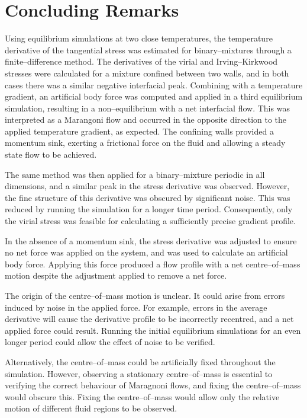 \section{Concluding Remarks}
Using equilibrium simulations at two close temperatures, the temperature derivative of the tangential stress was estimated for binary--mixtures through a finite--difference method.
The derivatives of the virial and Irving--Kirkwood stresses were calculated for a mixture confined between two walls, and in both cases there was a similar negative interfacial peak.
Combining with a temperature gradient, an artificial body force was computed and applied in a third equilibrium simulation, resulting in a non--equilibrium with a net interfacial flow.
This was interpreted as a Marangoni flow and occurred in the opposite direction to the applied temperature gradient, as expected.
The confining walls provided a momentum sink, exerting a frictional force on the fluid and allowing a steady state flow to be achieved.

The same method was then applied for a binary--mixture periodic in all dimensions, and a similar peak in the stress derivative was observed.
However, the fine structure of this derivative was obscured by significant noise.
This was reduced by running the simulation for a longer time period.
Consequently, only the virial stress was feasible for calculating a sufficiently precise gradient profile.

In the absence of a momentum sink, the stress derivative was adjusted to ensure no net force was applied on the system, and was used to calculate an artificial body force.
Applying this force produced a flow profile with a net centre--of--mass motion despite the adjustment applied to remove a net force.

The origin of the centre--of--mass motion is unclear. 
It could arise from errors induced by noise in the applied force.
For example, errors in the average derivative will cause the derivative profile to be incorrectly recentred, and a net applied force could result.
Running the initial equilibrium simulations for an even longer period could allow the effect of noise to be verified. 

Alternatively, the centre--of--mass could be artificially fixed throughout the simulation.
However, observing a stationary centre--of--mass is essential to verifying the correct behaviour of Maragnoni flows, and fixing the centre--of--mass would obscure this.
Fixing the centre--of--mass would allow only the relative motion of different fluid regions to be observed.

